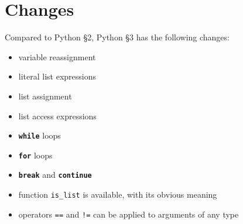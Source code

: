 





\section{Changes}

Compared to Python \S 2, Python \S 3 has the following changes:
\begin{itemize}
  \item variable reassignment
  \item literal list expressions
  \item list assignment
  \item list access expressions
  \item \textbf{\texttt{while}} loops
  \item \textbf{\texttt{for}} loops
  \item \textbf{\texttt{break}} and \textbf{\texttt{continue}}
  \item function
    \lstinline{is_list} is available, with its obvious meaning
  \item operators \texttt{==} and \texttt{!=} can be applied to
    arguments of any type
\end{itemize}


































